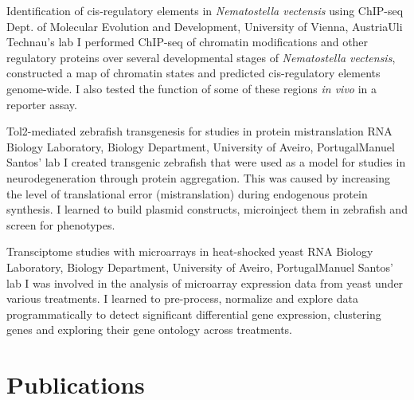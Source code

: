 \documentclass[11pt,a4paper,roman]{moderncv} %
\begin{document}
		{Identification of cis-regulatory elements in \textit{Nematostella vectensis} using ChIP-seq}
		{Dept. of Molecular Evolution and Development, University of Vienna, Austria}{Uli Technau's lab}
		{}
		{I performed ChIP-seq of chromatin modifications and other regulatory proteins over several developmental stages of \textit{Nematostella vectensis}, constructed a map of chromatin states and predicted cis-regulatory elements genome-wide. I also tested the function of some of these regions \textit{in vivo} in a reporter assay.}

		{Tol2-mediated zebrafish transgenesis for studies in protein mistranslation}
		{RNA Biology Laboratory, Biology Department, University of Aveiro, Portugal}{Manuel Santos' lab}
		{}
		{I created transgenic zebrafish that were used as a model for studies in neurodegeneration through protein aggregation. This was caused by increasing the level of translational error (mistranslation) during endogenous protein synthesis. I learned to build plasmid constructs, microinject them in zebrafish and screen for phenotypes.}

		{Transciptome studies with microarrays in heat-shocked yeast}
		{RNA Biology Laboratory, Biology Department, University of Aveiro, Portugal}{Manuel Santos' lab}
		{}
		{I was involved in the analysis of microarray expression data from yeast under various treatments. I learned to pre-process, normalize and explore data programmatically to detect significant differential gene expression, clustering genes and exploring their gene ontology across treatments.}


\section{Publications}
	
\end{document}
